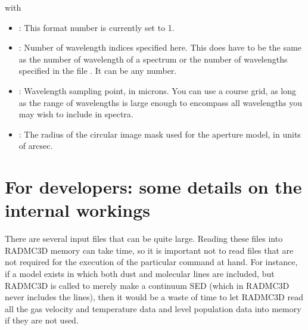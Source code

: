 \documentclass[letterpaper,10pt,english]{sphinxmanual}
\begin{document}
with
\begin{itemize}
\item {} 
: This format number is currently set to 1.

\item {} 
: Number of wavelength indices specified here. This
does  have to be the same as the number of wavelength of a
spectrum or the number of wavelengths specified in the file
. It can be any number.

\item {} 
: Wavelength sampling point, in microns. You can use
a course grid, as long as the range of wavelengths is large enough to
encompass all wavelengths you may wish to include in spectra.

\item {} 
: The radius of the circular image mask used for
the aperture model, in units of arcsec.

\end{itemize}


\section{For developers: some details on the internal workings}
\label{\detokenize{inputoutputfiles:for-developers-some-details-on-the-internal-workings}}
There are several input files that can be quite large. Reading these files
into RADMC\sphinxhyphen{}3D memory can take time, so it is important not to read files
that are not required for the execution of the particular command at
hand. For instance, if a model exists in which both dust and molecular
lines are included, but RADMC\sphinxhyphen{}3D is called to merely make a continuum
SED (which in RADMC\sphinxhyphen{}3D never includes the lines), then it would be a
waste of time to let RADMC\sphinxhyphen{}3D read all the gas velocity and temperature
data and level population data into memory if they are not used.
\end{document}
